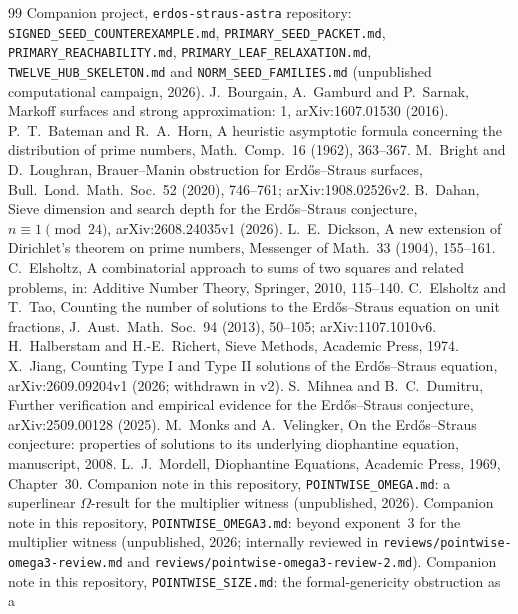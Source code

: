 \documentclass[11pt,reqno]{amsart}
\theoremstyle{definition}
\begin{document}
{\raggedright
\begin{thebibliography}{99}
 Companion project, \texttt{erdos-straus-astra} repository:
\texttt{SIGNED\_SEED\_COUNTEREXAMPLE.md}, \texttt{PRIMARY\_SEED\_PACKET.md},
\texttt{PRIMARY\_REACHABILITY.md}, \texttt{PRIMARY\_LEAF\_RELAXATION.md},
\texttt{TWELVE\_HUB\_SKELETON.md} and \texttt{NORM\_SEED\_FAMILIES.md}
(unpublished computational campaign, 2026).
 J.~Bourgain, A.~Gamburd and P.~Sarnak, Markoff surfaces and
strong approximation: 1, arXiv:1607.01530 (2016).
 P.~T.~Bateman and R.~A.~Horn, A heuristic asymptotic formula
concerning the distribution of prime numbers, Math.\ Comp.\ 16 (1962),
363--367.
 M.~Bright and D.~Loughran, Brauer--Manin obstruction for
Erd\H{o}s--Straus surfaces, Bull.\ Lond.\ Math.\ Soc.\ 52 (2020), 746--761;
arXiv:1908.02526v2.
 B.~Dahan, Sieve dimension and search depth for the
Erd\H{o}s--Straus conjecture, $n\equiv1\pmod{24}$, arXiv:2608.24035v1 (2026).
 L.~E.~Dickson, A new extension of Dirichlet's theorem on
prime numbers, Messenger of Math.\ 33 (1904), 155--161.
 C.~Elsholtz, A combinatorial approach to sums of two
squares and related problems, in: Additive Number Theory, Springer, 2010,
115--140.
 C.~Elsholtz and T.~Tao, Counting the number of solutions to the
Erd\H{o}s--Straus equation on unit fractions, J.\ Aust.\ Math.\ Soc.\ 94
(2013), 50--105; arXiv:1107.1010v6.
 H.~Halberstam and H.-E.~Richert, Sieve Methods, Academic
Press, 1974.
 X.~Jiang, Counting Type I and Type II solutions of the
Erd\H{o}s--Straus equation, arXiv:2609.09204v1 (2026; withdrawn in v2).
 S.~Mihnea and B.~C.~Dumitru, Further verification and
empirical evidence for the Erd\H{o}s--Straus conjecture, arXiv:2509.00128
(2025).
 M.~Monks and A.~Velingker, On the Erd\H{o}s--Straus conjecture:
properties of solutions to its underlying diophantine equation, manuscript,
2008.
 L.~J.~Mordell, Diophantine Equations, Academic Press,
1969, Chapter~30.
 Companion note in this repository,
\texttt{POINTWISE\_OMEGA.md}: a superlinear $\Omega$-result for the
multiplier witness (unpublished, 2026).
 Companion note in this repository,
\texttt{POINTWISE\_OMEGA3.md}: beyond exponent~3 for the multiplier witness
(unpublished, 2026; internally reviewed in
\texttt{reviews/pointwise-omega3-review.md} and
\texttt{reviews/pointwise-omega3-review-2.md}).
 Companion note in this repository,
\texttt{POINTWISE\_SIZE.md}: the formal-genericity obstruction as a

\end{thebibliography}}
\end{document}
